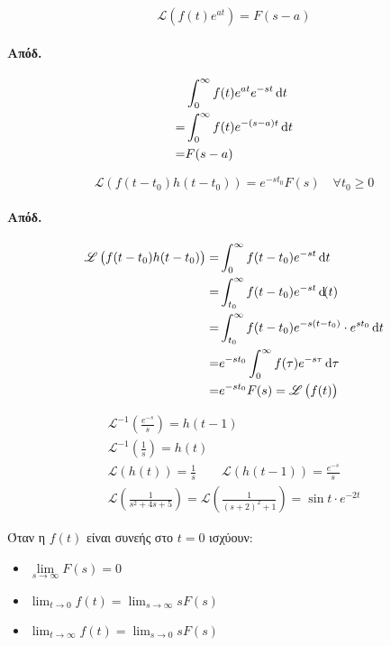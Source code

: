 \documentclass[11pt,a4paper,titlepage,final]{article}
\begin{document}
\begin{theorem*}{}
\[
\mathscr{L}\left(
f(t)e^{at}
\right) = F(s-a)
\]
\end{theorem*}
\paragraph{Απόδ.}
\begin{align*}
&\int_0^\infty f(t)e^{at}e^{-st}\dif t
\\=&
\int_0^\infty f(t)e^{-(s-a)t} \dif t
\\=&
F(s-a)
\end{align*}

\begin{theorem*}{}
\[
\mathscr{L}\left(
f(t-t_0)h(t-t_0)
\right)=e^{-st_0}F(s) \quad \forall t_0 \geq 0
\]
\end{theorem*}
\paragraph{Απόδ.}
\begin{align*}
\mathscr{L}\left(
f(t-t_0)h(t-t_0)\right) =&
\int_0^\infty f(t-t_0)e^{-st} \dif t
\\=&
\int_{t_0}^\infty f(t-t_0)e^{-st} \dif(t)
\\=&
\int_{t_0}^\infty f(t-t_0)e^{-s(t-t_0)}\cdot e^{st_0}\dif t
\\=&
e^{-st_0} \int_0^\infty f(\tau) e^{-s\tau} \dif \tau
\\=&
e^{-st_0} F(s) = \mathscr{L}\left(f(t)\right)
\end{align*}


\begin{gather*}
\mathscr{L}^{-1} \left(
\frac{e^{-s}}{s}\right)=h(t-1)\\
\mathscr{L}^{-1}\left(\frac{1}{s}\right) = h(t)\\
\mathscr{L}\left(
h(t)
\right) = \frac{1}{s}\qquad
\mathscr{L}\left(
h(t-1)
\right)=\frac{e^{-s}}{s}\\
\mathscr{L}\left(
\frac{1}{s^2+4s+5}
\right) = \mathscr{L}\left(
\frac{1}{(s+2)^2+1}
\right)=\sin t \cdot e^{-2t}
\end{gather*}

\begin{theorem*}{}
Όταν η \(f(t)\) είναι συνεής στο \(t=0\) ισχύουν:
\begin{itemize}
\item \(\lim\limits_{s\to \infty} F(s)=0 \)
\item \(\lim_{t\to0} f(t) = \lim_{s\to \infty} sF(s)  \)
\item \(\lim_{t\to \infty}f(t) = \lim_{s\to 0} s F(s)  \)
\end{itemize}
\end{theorem*}
\end{document}

